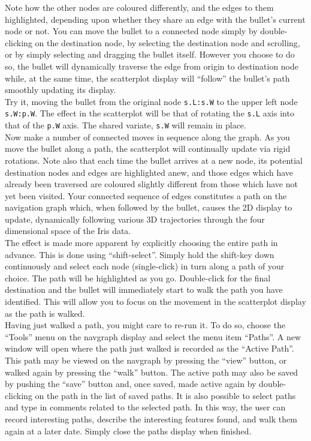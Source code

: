 \documentclass[12pt,oneside,titlepage,letter]{article}
\begin{document}
Note how the other nodes are coloured differently, and the edges to them highlighted, depending upon whether they share an edge with the bullet's current node or not.  
You can move the bullet to a connected node simply by double-clicking on the destination node, by selecting the destination node and scrolling, or by simply selecting and dragging the bullet itself.
However you choose to do so, the bullet will dynamically traverse the edge from origin to destination node while, at the same time, the scatterplot display
will ``follow'' the bullet's path smoothly updating its display.\\

Try it, moving the bullet from the original node \texttt{s.L:s.W} to the upper left node \texttt{s.W:p.W}.
The effect in the scatterplot will be that of rotating the \texttt{s.L} axis into that of the \texttt{p.W} axis.
The shared variate, \texttt{s.W} will remain in place.  \\

Now make a number of connected moves in sequence along the graph.  
As you move the bullet along a path, the scatterplot will continually update via rigid rotations.
Note also that each time the bullet arrives at a new node, its potential destination nodes and edges are highlighted anew, and those edges which have already been traversed are coloured slightly different from those which have not yet been visited.  Your connected sequence of edges constitutes a path on the navigation graph which, when followed by the bullet, causes the 2D display
to update, dynamically following various 3D trajectories through the four dimensional space
of the Iris data. \\

The effect is made more apparent by explicitly choosing the entire path in advance.  This is done using ``shift-select''.  Simply hold the shift-key down continuously and select each node (single-click) in turn along 
a path of your choice.  The path will be highlighted as you go.  Double-click for the final destination
and the bullet will immediately start to walk the path you have identified.  This will allow you to focus on the movement in the scatterplot display as the path is walked.\\

Having just walked a path, you might care to re-run it.  To do so, choose the ``Tools'' menu on the navgraph display and select the menu item ``Paths''.  A new window will open where the path just walked is recorded as the ``Active Path''.   This path may be viewed on the navgraph by pressing the ``view'' button, or walked again by pressing the ``walk'' button.  The active path may also be saved by pushing the ``save'' button and, once saved, made active again by double-clicking on the path in the list of saved paths.  It is also possible to select paths and type in comments related to the selected path.  In this way, the user can record interesting paths, describe the interesting features found, and walk them again at a later date.  Simply close the paths display when finished.\\
\end{document}
